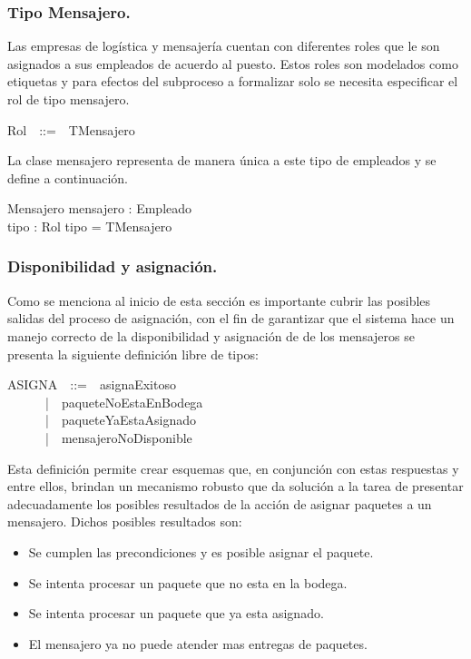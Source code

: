 \documentclass[12pt,a4paper]{article}
\begin{document}
\subsubsection{Tipo Mensajero.}
Las empresas de logística y mensajería cuentan con diferentes roles que le son asignados a sus empleados de acuerdo al puesto. Estos roles son modelados como etiquetas y para efectos del subproceso a formalizar solo se necesita especificar el rol de tipo mensajero.

\begin{zed}
Rol~~::=~~TMensajero
\end{zed}

La clase mensajero representa de manera única a este tipo de empleados y se define a continuación.

\begin{schema}{Mensajero}
mensajero : Empleado\\
tipo : Rol
\where
tipo = TMensajero
\end{schema}

\subsubsection{Disponibilidad y asignación.}
Como se menciona al inicio de esta sección es importante cubrir las posibles salidas del proceso de asignación, con el fin de garantizar que el sistema hace un manejo correcto de la disponibilidad y asignación de de los mensajeros se presenta la siguiente definición libre de tipos:

\begin{zed}
ASIGNA~~::=~~asignaExitoso\\
~~~~~~|~~paqueteNoEstaEnBodega\\
~~~~~~|~~paqueteYaEstaAsignado\\
~~~~~~|~~mensajeroNoDisponible\\
\end{zed}

Esta definición permite crear esquemas que, en conjunción con estas respuestas y entre ellos, brindan un mecanismo robusto que da solución a la tarea de presentar adecuadamente los posibles resultados de la acción de asignar paquetes a un mensajero. Dichos posibles resultados son:
\begin{itemize}
\item Se cumplen las precondiciones y es posible asignar el paquete.
\item Se intenta procesar un paquete que no esta en la bodega.
\item Se intenta procesar un paquete que ya esta asignado.
\item El mensajero ya no puede atender mas entregas de paquetes.
\end{itemize} 
\end{document}
